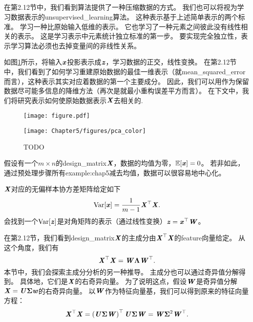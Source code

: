 \subsection{}
\label{sec:principal_components_analysis_chap5}
在第2.12节中，我们看到算法提供了一种压缩数据的方式。
我们也可以将视为学习数据表示的\gls{unsupervised_learning}算法。
这种表示基于上述简单表示的两个标准。
学习一种比原始输入低维的表示。
它也学习了一种元素之间彼此没有线性相关的表示。
这是学习表示中元素统计独立标准的第一步。
要实现完全独立性，表示学习算法必须也去掉变量间的非线性关系。


如图\ref{fig:chap5_pca}所示，将输入$\Vx$投影表示成$\Vz$，学习数据的正交，线性变换。
在第2.12节中，我们看到了如何学习重建原始数据的最佳一维表示（就\gls{mean_squared_error}而言），这种表示其实对应着数据的第一个主要成分。
因此，我们可以用作为保留数据尽可能多信息的降维方法（再次是就最小重构误差平方而言）。
在下文中，我们将研究表示如何使原始数据表示$\MX$去相关的.

\begin{figure}[!htb]
\ifOpenSource
\centerline{\texttt{[image: figure.pdf]}}
\else
\centerline{\texttt{[image: Chapter5/figures/pca\_color]}}
\fi
\caption{TODO}
\label{fig:chap5_pca}
\end{figure}

假设有一个$m\times n$的\gls{design_matrix}$\MX$，数据的均值为零，$\SetE[\Vx] = 0$。
若非如此，通过预处理步骤所有\gls{example:chap5}减去均值，数据可以很容易地中心化。

$\MX$对应的无偏样本协方差矩阵给定如下
\begin{equation}
    \text{Var}[\Vx] = \frac{1}{m-1} \MX^\Tsp \MX .
\end{equation}
会找到一个$\text{Var}[\Vz]$是对角矩阵的表示（通过线性变换）$\Vz=\Vx^\Tsp\MW$。

在第2.12节，我们看到\gls{design_matrix}$\MX$的主成分由$\MX^\Tsp\MX$的\gls{feature}向量给定。
从这个角度，我们有
\begin{equation}
    \MX^\Tsp\MX = \MW \VLambda \MW^\Tsp .
\end{equation}
本节中，我们会探索主成分分析的另一种推导。
主成分也可以通过奇异值分解得到。
具体地，它们是$\MX$的右奇异向量。
为了说明这点，假设$\MW$是奇异值分解$\MX = \MU\VSigma\Vw$的右奇异向量。
以$\MW$作为特征向量基，我们可以得到原来的特征向量方程：
\begin{equation}
    \MX^\Tsp\MX = \left( \MU\VSigma \MW \right)^\Tsp \MU\VSigma \MW = 
    \MW \VSigma^2 \MW^\Tsp .
\end{equation}

